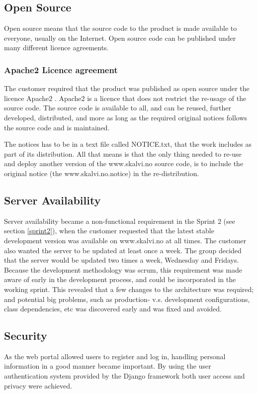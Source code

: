 \subsection{Open Source}
Open source means that the source code to the product is made available to everyone, usually on the Internet. Open source code can be published under many different licence agreements.

\subsubsection{Apache2 Licence agreement}
The customer required that the product was published as open source under the licence Apache2 \cite{apache2}. Apache2 is a licence that does not restrict the re-usage of the source code. The source code is available to all, and can be reused, further developed, distributed, and more as long as the required original notices follows the source code and is maintained. 

The notices has to be in a text file called NOTICE.txt, that the work includes as part of its distribution. All that means is that the only thing needed to re-use and deploy another version of the www.skalvi.no source code, is to include the original notice (the www.skalvi.no.notice) in the re-distribution.


\subsection{Server Availability}
Server availability became a non-functional requirement in the Sprint 2 (see section \ref{sprint2}), when the customer requested that the latest stable development version was available on www.skalvi.no at all times. The customer also wanted the server to be updated at least once a week. The group decided that the server would be updated two times a week, Wednesday and Fridays. Because the development methodology was scrum, this requirement was made aware of early in the  development process, and could be incorporated in the working sprint. This revealed that a few changes to the architecture was required; and potential big problems, such as production- v.s. development configurations, class dependencies, etc was discovered early and was fixed and avoided.

\subsection{Security}
As the web portal allowed users to register and log in, handling personal information in a good manner became important. By using the user authentication system provided by the Django framework both user access and privacy were achieved.


